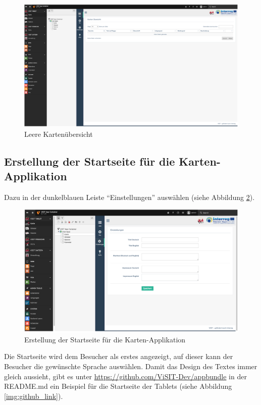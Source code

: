 \begin{figure}[ht!]
\centering
\includegraphics[width=12cm]{Figures/paula/kartenapp.png}
\caption{Leere Kartenübersicht}
\label{img:kartenapp}
\end{figure}

\subsection{Erstellung der Startseite für die Karten-Applikation}

Dazu in der dunkelblauen Leiste “Einstellungen” auswählen (siehe Abbildung \ref{img:startseite_karte}).

\begin{figure}[ht!]
\centering
\includegraphics[width=12cm]{Figures/paula/startseite_karte.png}
\caption{Erstellung der Startseite für die Karten-Applikation}
\label{img:startseite_karte}
\end{figure}

Die Startseite wird dem Besucher als erstes angezeigt, auf dieser kann der Besucher die gewünschte Sprache auswählen. Damit das Design des Textes immer gleich aussieht, gibt es unter \url{https://github.com/ViSIT-Dev/appbundle} in der README.md ein Beispiel für die Startseite der Tablets (siehe Abbildung \ref{img:github_link}).

